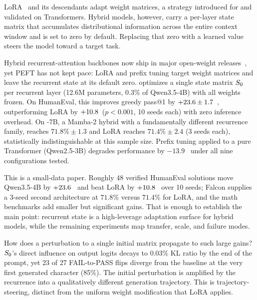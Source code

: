 \documentclass{article}
\begin{document}
LoRA~\cite{lora} and its descendants adapt weight matrices, a strategy introduced
for and validated on Transformers.
Hybrid models, however, carry a per-layer state matrix that accumulates distributional
information across the entire context window and is set to zero by default.
Replacing that zero with a learned value steers the model toward a target task.

Hybrid recurrent-attention backbones now ship in major open-weight releases~\cite{gated_deltanet,falconh1,mamba3}, yet PEFT has not kept pace: LoRA and prefix tuning target weight matrices and leave the recurrent state at its default zero.
\method optimizes a single state matrix $S_0$ per recurrent layer (12.6M
parameters, 0.3\% of Qwen3.5-4B) with all weights frozen.
On HumanEval, this improves greedy pass@1 by $+23.6 \pm 1.7$~\pp,
outperforming LoRA by $+10.8$~\pp ($p < 0.001$, 10 seeds each) with zero
inference overhead.
On \falcon-7B, a Mamba-2 hybrid with a fundamentally different recurrence
family, \methodshort reaches $71.8\% \pm 1.3$ and LoRA reaches $71.4\% \pm 2.4$ (3 seeds each), statistically indistinguishable at this sample size.
Prefix tuning applied to a pure Transformer (Qwen2.5-3B) degrades performance
by $-13.9$~\pp{} under all nine configurations tested.

This is a small-data paper. Roughly 48 verified HumanEval solutions move
Qwen3.5-4B by $+23.6$~\pp{} and beat LoRA by $+10.8$~\pp{} over
10 seeds; Falcon supplies a 3-seed second architecture at $71.8\%$ versus
$71.4\%$ for LoRA, and the math benchmarks add smaller but significant gains.
That is enough to establish the main point: recurrent state is a high-leverage
adaptation surface for hybrid models, while the remaining experiments map
transfer, scale, and failure modes.

How does a perturbation to a single initial matrix propagate to such large gains?
$S_0$'s direct influence on output logits decays to 0.03\% KL ratio by the
end of the prompt, yet 23 of 27 FAIL-to-PASS flips diverge from the baseline
at the very first generated character (85\%).
The initial perturbation is amplified by the recurrence into a qualitatively
different generation trajectory. This is trajectory-steering, distinct from the uniform
weight modification that LoRA applies.
\end{document}
